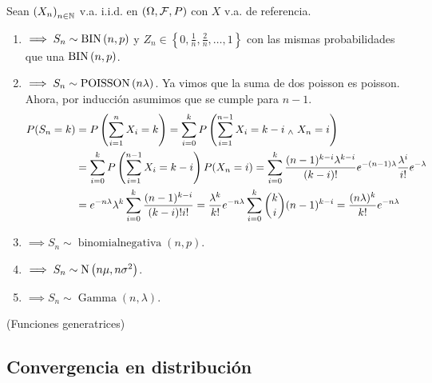 Sean $\left(X_n\right)_{n\in \mathbb{N}}$ v.a. i.i.d. en $(\Omega, \mathcal{F}, P)$ con $X$ v.a. de referencia.
\begin{enumerate}
	\item {} $\implies S_n \sim \operatorname{BIN}\left(n,p\right)$ y $Z_n \in \left\{0, \frac{1}{n}, \frac{2}{n}, \dots, 1\right\}$ con las mismas probabilidades que una $\operatorname{BIN}\left(n,p\right)$.
	\item {} $\implies S_n \sim \operatorname{POISSON}\left(n\lambda\right)$. Ya vimos que la suma de dos poisson es poisson. Ahora, por inducción asumimos que se cumple para $n-1$.
	      \[\begin{aligned}
			      P(S_n = k) & = P\left(\sum_{i=1}^{n} X_i = k\right) = \sum_{i=0}^k P\left(\sum_{i=1}^{n-1} X_i = k-i \; _{\wedge} \; X_n = i\right)                                                                          \\
			                 & = \sum_{i=0}^k P\left(\sum_{i=1}^{n-1} X_i = k-i\right)P(X_n = i) = \sum_{i=0}^k \frac{(n-1)^{k-i} \lambda^{k-i}}{(k-i)!}e^{-(n-1)\lambda}\frac{\lambda^i}{i!}e^{-\lambda}          \\
			                 & = e^{-n\lambda} \lambda^k \sum_{i=0}^k \frac{(n-1)^{k-i}}{(k-i)!i!} = \frac{\lambda^k}{k!}e^{-n\lambda} \sum_{i=0}^k \binom{k}{i}(n-1)^{k-i} = \frac{(n\lambda)^k}{k!}e^{-n\lambda}
		      \end{aligned}\]
	\item {} $\implies S_n \sim \operatorname{binomial negativa}(n,p)$.
	\item {} $\implies S_n \sim \operatorname{N}\left(n\mu, n\sigma^2\right)$.
	\item {} $\implies S_n \sim \operatorname{Gamma}(n,\lambda)$.
\end{enumerate}

 (Funciones generatrices)


\subsection{Convergencia en distribución}

